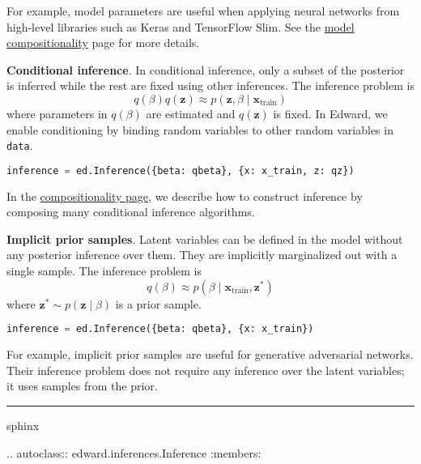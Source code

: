 For example, model parameters are useful when applying neural networks
from high-level libraries such as Keras and TensorFlow Slim. See
the \href{/api/model-compositionality}{model compositionality} page
for more details.

\textbf{Conditional inference}.
In conditional inference, only a subset of the posterior is inferred
while the rest are fixed using other inferences. The inference
problem is
\begin{equation*}
q(\beta)q(\mathbf{z})\approx
p(\mathbf{z}, \beta\mid\mathbf{x}_{\text{train}})
\end{equation*}
where parameters in $q(\beta)$ are estimated and $q(\mathbf{z})$ is
fixed.
%
In Edward, we enable conditioning by binding random variables to other
random variables in \texttt{data}.
\begin{lstlisting}[language=Python]
inference = ed.Inference({beta: qbeta}, {x: x_train, z: qz})
\end{lstlisting}

In the \href{/api/inference-compositionality}{compositionality page},
we describe how to construct inference by composing
many conditional inference algorithms.

\textbf{Implicit prior samples}.
Latent variables can be defined in the model without any posterior
inference over them. They are implicitly marginalized out with a
single sample. The inference problem is
\begin{equation*}
q(\beta)\approx
p(\beta\mid\mathbf{x}_{\text{train}}, \mathbf{z}^*)
\end{equation*}
where $\mathbf{z}^*\sim p(\mathbf{z}\mid\beta)$ is a prior sample.

\begin{lstlisting}[language=Python]
inference = ed.Inference({beta: qbeta}, {x: x_train})
\end{lstlisting}

For example, implicit prior samples are useful for generative adversarial
networks. Their inference problem does not require any inference over
the latent variables; it uses samples from the prior.

\begin{center}\rule{3in}{0.4pt}\end{center}

{{sphinx

.. autoclass:: edward.inferences.Inference
   :members:

}}
